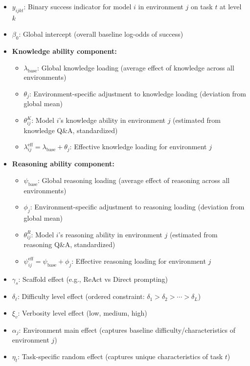 \documentclass{article}
\begin{document}
\begin{itemize}
    \item $y_{ijkt}$: Binary success indicator for model $i$ in environment $j$ on task $t$ at level $k$

    \item $\beta_0$: Global intercept (overall baseline log-odds of success)

    \item \textbf{Knowledge ability component:}
    \begin{itemize}
        \item $\lambda_\text{base}$: Global knowledge loading (average effect of knowledge across all environments)
        \item $\theta_j$: Environment-specific adjustment to knowledge loading (deviation from global mean)
        \item $\theta_{ij}^K$: Model $i$'s knowledge ability in environment $j$ (estimated from knowledge Q\&A, standardized)
        \item $\lambda_{ij}^\text{eff} = \lambda_\text{base} + \theta_j$: Effective knowledge loading for environment $j$
    \end{itemize}

    \item \textbf{Reasoning ability component:}
    \begin{itemize}
        \item $\psi_\text{base}$: Global reasoning loading (average effect of reasoning across all environments)
        \item $\phi_j$: Environment-specific adjustment to reasoning loading (deviation from global mean)
        \item $\theta_{ij}^R$: Model $i$'s reasoning ability in environment $j$ (estimated from reasoning Q\&A, standardized)
        \item $\psi_{ij}^\text{eff} = \psi_\text{base} + \phi_j$: Effective reasoning loading for environment $j$
    \end{itemize}

    \item $\gamma_s$: Scaffold effect (e.g., ReAct vs Direct prompting)

    \item $\delta_\ell$: Difficulty level effect (ordered constraint: $\delta_1 > \delta_2 > \cdots > \delta_L$)

    \item $\xi_v$: Verbosity level effect (low, medium, high)

    \item $\alpha_j$: Environment main effect (captures baseline difficulty/characteristics of environment $j$)

    \item $\eta_t$: Task-specific random effect (captures unique characteristics of task $t$)
\end{itemize}
\end{document}
